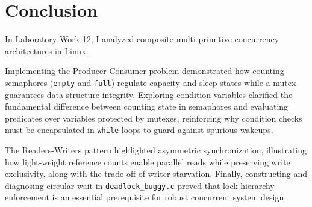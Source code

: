 \documentclass{labreport}
\begin{document}
\section{Conclusion}

In Laboratory Work 12, I analyzed composite multi-primitive concurrency architectures in Linux.

Implementing the Producer-Consumer problem demonstrated how counting semaphores (\texttt{empty} and \texttt{full}) regulate capacity and sleep states while a mutex guarantees data structure integrity. Exploring condition variables clarified the fundamental difference between counting state in semaphores and evaluating predicates over variables protected by mutexes, reinforcing why condition checks must be encapsulated in \texttt{while} loops to guard against spurious wakeups.

The Readers-Writers pattern highlighted asymmetric synchronization, illustrating how light-weight reference counts enable parallel reads while preserving write exclusivity, along with the trade-off of writer starvation. Finally, constructing and diagnosing circular wait in \texttt{deadlock\_buggy.c} proved that lock hierarchy enforcement is an essential prerequisite for robust concurrent system design.
\end{document}
